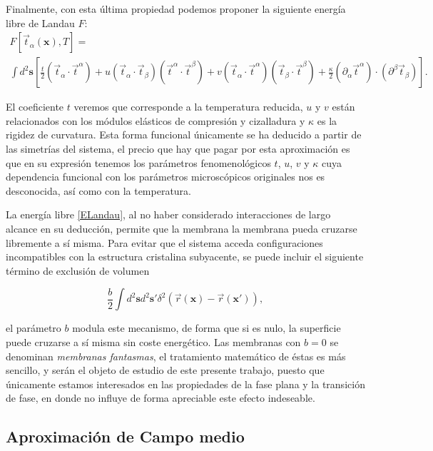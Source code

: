  Finalmente, con esta última propiedad podemos proponer la siguiente energía libre de Landau $F$:
  \begin{multline}\label{ELandau}
    F[\vec{t}_{\alpha}(\mathbf{x}),T]=\\
\int d^2\mathbf{s}
    \left[
      \frac{t}{2}(\vec{t}_{\alpha}\cdot\vec{t}^{\alpha})+
      u(\vec{t}_{\alpha}\cdot\vec{t}_{\beta})(\vec{t}^{\alpha}\cdot\vec{t}^{\beta})+
      v(\vec{t}_{\alpha}\cdot\vec{t}^{\alpha})(\vec{t}_{\beta}\cdot\vec{t}^{\beta})+
      \frac{\kappa}{2}(\partial_{\alpha}\vec{t}^{\alpha})\cdot(\partial^{\beta}\vec{t}_{\beta}) \right].
  \end{multline}

El coeficiente $t$ veremos que corresponde a la temperatura reducida, $u$ y $v$ están
relacionados con los módulos elásticos de compresión y cizalladura y $\kappa$
es la rigidez de curvatura. Esta forma funcional únicamente se ha deducido a
partir de las simetrías del sistema, el precio que hay que pagar por esta aproximación es que en su
expresión tenemos los parámetros fenomenológicos $t$, $u$, $v$ y $\kappa$ cuya
dependencia funcional con los parámetros microscópicos originales nos es
desconocida, así como con la temperatura.


La energía libre \eqref{ELandau}, al no haber considerado interacciones de
largo alcance en su deducción, permite que la membrana la membrana pueda 
cruzarse libremente a sí misma. Para evitar que el sistema acceda
configuraciones incompatibles con la estructura cristalina subyacente, se
puede incluir el siguiente término de exclusión de volumen 

\begin{equation*}
\frac{b}{2}\int d^2\mathbf{s} d^2\mathbf{s'}
\delta^2(\vec{r}(\mathbf{x})-\vec{r}(\mathbf{x'})),
\end{equation*}

el parámetro $b$ modula este mecanismo, de forma que si es nulo, la superficie
puede cruzarse a sí misma sin coste energético. Las membranas con $b=0$ se
denominan \textit{membranas fantasmas}, el tratamiento matemático de éstas es
 más sencillo, y serán el objeto de estudio de este presente
trabajo, puesto que únicamente estamos interesados en las propiedades de la
fase plana y la transición de fase, en donde no influye de forma apreciable
este efecto indeseable. 

\subsection{Aproximación de Campo medio}\label{campo_medio}

